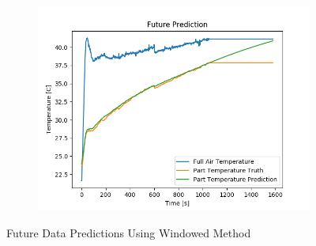 \begin{figure}[htb]
\begin{subfigure}{.33\linewidth}
    	\includegraphics[width=\linewidth]{lstm/lstm_w_future3.png}
    \end{subfigure}
    \caption{Future Data Predictions Using Windowed Method}
    \label{fig:Future_predct_win}
\end{figure}
\clearpage
